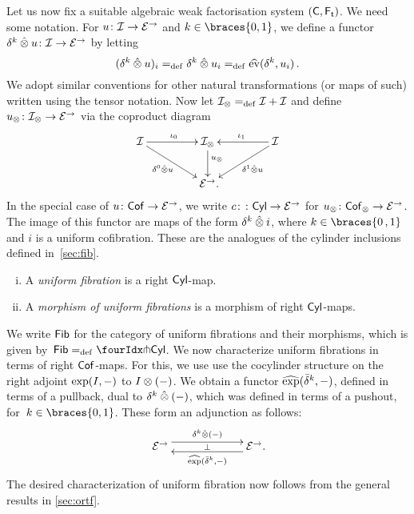 \documentclass[reqno,10pt,a4paper,oneside,draft]{amsart}
\begin{document}
{{Let us now fix a suitable algebraic weak factorisation system $(\mathsf{C}, \mathsf{F_t})$. 
We need some notation. For $u \colon \mathcal{I} \to \mathcal{E}^\to$ and $k \in \braces{0, 1}$, we define a functor $\delta^k \mathbin{\hat{\otimes}} u \colon \mathcal{I} \to \mathcal{E}^\to$ by letting
\[
  (\delta^k \mathbin{\hat{\otimes}} u)_i =_{\operatorname{def}} \delta^k \mathbin{\hat{\otimes}} u_i  =_{\operatorname{def}} \widehat{\operatorname{ev}}(\delta^k, u_i) \, .
\]
We adopt similar conventions for other natural transformations (or maps of such) written using the tensor notation.
Now let $\mathcal{I}_\otimes =_{\operatorname{def}} \mathcal{I} + \mathcal{I}$ and define $u_\otimes \colon \mathcal{I}_\otimes \to \mathcal{E}^\to$ via the coproduct diagram
\begin{equation} \label{equ:u-tensor}
\begin{gathered}
\xymatrix@C+2em{
  \cal{I}
  \ar[r]^{\iota_0}
  \ar[dr]_-{\lcyl \hatotimes u}
&
  \cal{I}_\otimes
  \ar[d]^(.4){u_\otimes}
&
  \cal{I}
  \ar[dl]^-{\rcyl \hatotimes u}
  \ar[l]_{\iota_1}
\\&
  \catE^\to
\rlap{.}}
\end{gathered}
\end{equation}
In the special case of $u \colon \mathsf{Cof} \to \mathcal{E}^\to$, we write $c \colon \colon \mathsf{Cyl} \to \mathcal{E}^\to$ for $u_\otimes \colon \mathsf{Cof}_\otimes \to \mathcal{E}^\to$.
The image of this functor are maps of the form $\delta^k \mathbin{\hat{\otimes}} i$, where $k \in \braces{ 0 \, , 1}$ and $i$ is a uniform
cofibration. These are the analogues of the cylinder inclusions defined in~\cref{sec:fib}.


\begin{definition} \label{def:I-fibration} \hfill 
\begin{enumerate}[(i)]
\item A \emph{uniform fibration} is a right $\mathsf{Cyl}$-map.
\item A \emph{morphism of uniform fibrations} is a morphism of right $\mathsf{Cyl}$-maps.
\end{enumerate}
\end{definition}


We write $\mathsf{Fib}$ for the category of uniform fibrations and their morphisms, which is given by~$\Fib  \defeq \liftr{\Cyl}$. We now characterize uniform fibrations in terms of right $\mathsf{Cof}$-maps. For this, we use use the cocylinder structure on the right adjoint $\exp(I, -)$ to $I \otimes (-)$. We obtain a functor $\operatorname{\widehat{exp}}(\bar{\delta}^k, -)$, defined in terms of a pullback, dual to $\delta^k \mathbin{\hat{\otimes}} (-)$, which was defined in terms of a pushout, for~$k \in \braces{0, 1}$. These form an adjunction as follows:
\[
\xymatrix@C+4em{
  \catE^\to
  \ar@<1ex>[r]^{\kcyl \hatotimes (-)}
  \ar@{}[r]|{\bot}
&
  \catE^\to
  \ar@<1ex>[l]^{\hatexp(\bar{\delta}^k, -)}
\rlap{.}}
\]
The desired characterization of uniform fibration now follows from the general results in \cref{sec:ortf}.

}}
\end{document}
